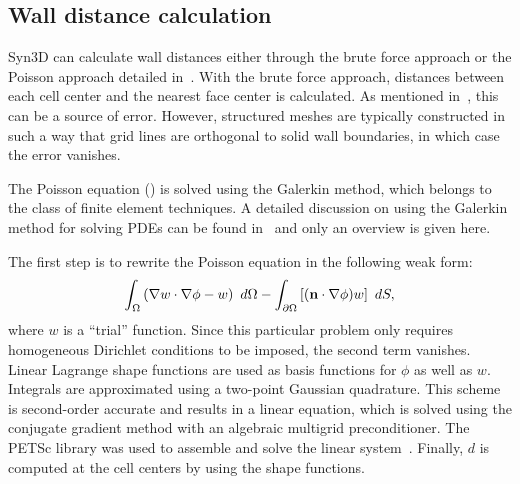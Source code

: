 \subsection{Wall distance calculation}
\label{sec:synwalldist}
Syn3D can calculate wall distances either through the brute force approach or the Poisson approach detailed in~. With the brute force approach, distances between each cell center and the nearest face center is calculated. As mentioned in~, this can be a source of error. However, structured meshes are typically constructed in such a way that grid lines are orthogonal to solid wall boundaries, in which case the error vanishes.

The Poisson equation () is solved using the Galerkin method, which belongs to the class of finite element techniques. A detailed discussion on using the Galerkin method for solving PDEs can be found in~\cite{reddy1993introduction} and only an overview is given here.

The first step is to rewrite the Poisson equation in the following weak form:
\begin{equation*}
    \int_\Omega \left(
        \nabla w\cdot\nabla\phi - w
    \right)~d\Omega
    - \int_{\partial \Omega} \left[
        (\mathbf{n}\cdot\nabla\phi)w
    \right]~dS,
\end{equation*}
where $w$ is a ``trial'' function. Since this particular problem only requires homogeneous Dirichlet conditions to be imposed, the second term vanishes. Linear Lagrange shape functions are used as basis functions for $\phi$ as well as $w$. Integrals are approximated using a two-point Gaussian quadrature. This scheme is second-order accurate and results in a linear equation, which is solved using the conjugate gradient method with an algebraic multigrid preconditioner. The PETSc library was used to assemble and solve the linear system~\cite{petsc}. Finally, $d$ is computed at the cell centers by using the shape functions.
